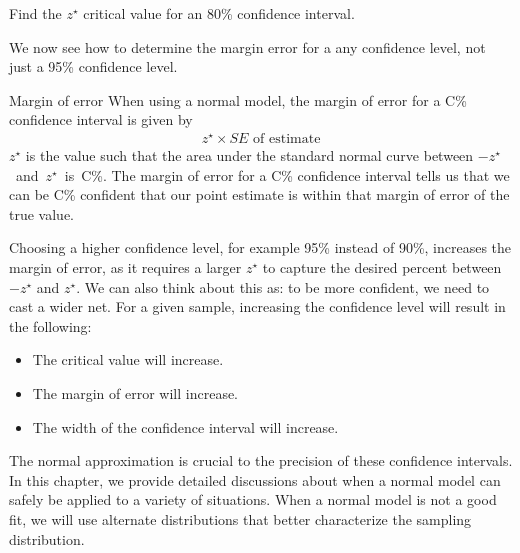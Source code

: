 \D{\newpage}

\begin{exercisewrap}
\begin{nexercise} \label{find90CIForRun10AgeExercise}
Find the $z^{\star}$ critical value for an 80\% confidence interval.\footnotemark
\end{nexercise}
\end{exercisewrap}


We now see how to determine the margin error for a any confidence level, not just a 95\% confidence level.

\begin{onebox}{Margin of error}\label{marginOfErrorTermBox2}
When using a normal model, the margin of error for a C\% confidence interval is given by
\begin{align*}
z^{\star} \times SE \text{ of estimate}
\end{align*}
$z^{\star}$ is the value such that the area under the standard normal curve between \mbox{$-z^{\star}$ and $z^{\star}$ is C\%.} The margin of error for a C\% confidence interval tells us that we can be C\% confident that our point estimate is within that margin of error of the true value.  
\end{onebox}

Choosing a higher confidence level, for example 95\% instead of 90\%, increases the margin of error, as it requires a larger $z^{\star}$ to capture the desired percent between $-z^{\star}$ and $z^{\star}$.  We can also think about this as: to be more confident, we need to cast a wider net.  For a given sample, increasing the confidence level will result in the following:
\begin{itemize}
\item[i.] The critical value will increase.
\item[ii.] The margin of error will increase.
\item[iii.] The width of the confidence interval will increase.
\end{itemize}

The normal approximation is crucial to the precision of these confidence intervals. In this chapter, we provide detailed discussions about when a normal model can safely be applied to a variety of situations. When a normal model is not a good fit, we will use alternate distributions that better characterize the sampling distribution.


